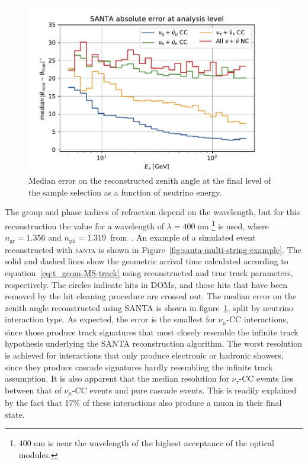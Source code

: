 \begin{figure}
    \centering
    \includegraphics[width=0.8\linewidth]{figures/icecube/reconstruction/santa/santa_absolute_error_final.pdf}
    \caption{Median error on the reconstructed zenith angle at the final level of the sample selection as a function of neutrino energy.}
    \label{fig:santa-resolution}
\end{figure}

The group and phase indices of refraction depend on the wavelength, but for this reconstruction the value for a wavelength of $\lambda=400\;\mathrm{nm}$
\footnote{$400\;\mathrm{nm}$ is near the wavelength of the highest acceptance of the optical modules.\cite{icecube_detector_17}} is used, where $n_{\mathrm{gr}}=1.356$ and $n_{\mathrm{ph}}=1.319$~from~. An example of a simulated event reconstructed with \textsc{santa} is shown in Figure~\ref{fig:santa-multi-string-example}. The solid and dashed lines show the geometric arrival time calculated according to equation~\ref{eq:t_geom-MS-track} using reconstructed and true track parameters, respectively. The circles indicate hits in DOMs, and those hits that have been removed by the hit cleaning procedure are crossed out. The median error on the zenith angle reconstructed using \textsc{SANTA} is shown in figure~\ref{fig:santa-resolution}, split by neutrino interaction type. As expected, the error is the smallest for $\nu_\mu$-CC interactions, since those produce track signatures that most closely resemble the infinite track hypothesis underlying the \textsc{SANTA} reconstruction algorithm. The worst resolution is achieved for interactions that only produce electronic or hadronic showers, since they produce cascade signatures hardly resembling the infinite track assumption. It is also apparent that the median resolution for $\nu_\tau$-CC events lies between that of $\nu_\mu$-CC events and pure cascade events. This is readily explained by the fact that 17\% of these interactions also produce a muon in their final state.

